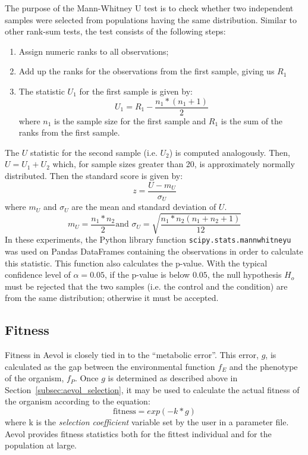 The purpose of the Mann-Whitney U test is to check whether two independent samples were selected from populations having the same distribution. Similar to other rank-sum tests, the test consists of the following steps:
\begin{enumerate}
	\item Assign numeric ranks to all observations;
	\item Add up the ranks for the observations from the first sample, giving us $R_1$
	\item The statistic $U_1$ for the first sample is given by:
	\begin{equation*}
	U_1 = R_1 - \frac{n_1*(n_1 + 1)}{2}
	\end{equation*}
	where $n_1$ is the sample size for the first sample and $R_1$ is the sum of the ranks from the first sample.
\end{enumerate}
The $U$ statistic for the second sample (i.e. $U_2$) is computed analogously. Then, $U = U_1 + U_2$ which, for sample sizes greater than 20, is approximately normally distributed. Then the standard score is given by:
\begin{equation*}
z = \frac{U - m_U}{\sigma_U}
\end{equation*}
where $m_U$ and $\sigma_U$ are the mean and standard deviation of $U$.
\begin{equation*}
m_U = \frac{n_1*n_2}{2} \text{and } \sigma_U = \sqrt{\frac{n_1*n_2\left(n_1 + n_2 +1\right)}{12}}
\end{equation*} In these experiments, the Python library function \texttt{scipy.stats.mannwhitneyu} was used on Pandas DataFrames containing the observations in order to calculate this statistic. This function also calculates the p-value. With the typical confidence level of $\alpha = 0.05$, if the p-value is below $0.05$, the null hypothesis $H_o$ must be rejected that the two samples (i.e. the control and the condition) are from the same distribution; otherwise it must be accepted.

\subsection{Fitness}
Fitness in Aevol is closely tied in to the ``metabolic error''. This error, $g$, is calculated as the gap between the environmental function $f_E$ and the phenotype of the organism, $f_P$. Once $g$ is determined as described above in Section~\ref{subsec:aevol_selection}, it may be used to calculate the actual fitness of the organism according to the equation:
\begin{equation*}
\text{fitness} = exp(-k*g)
\end{equation*} 
where k is the \textit{selection coefficient} variable set by the user in a parameter file. Aevol provides fitness statistics both for the fittest individual and for the population at large.
